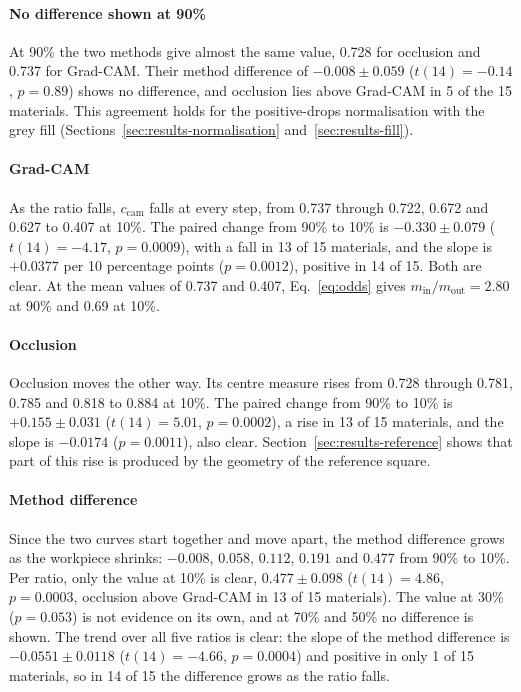 \paragraph{No difference shown at 90\%}
At 90\% the two methods give almost the same value, 0.728 for occlusion and 0.737 for
Grad-CAM. Their method difference of $-0.008 \pm 0.059$ ($t(14) = -0.14$, $p = 0.89$)
shows no difference, and occlusion lies above Grad-CAM in 5 of the 15 materials. This
agreement holds for the positive-drops normalisation with the grey fill
(Sections~\ref{sec:results-normalisation} and~\ref{sec:results-fill}).

\paragraph{Grad-CAM}
As the ratio falls, $c_{\mathrm{cam}}$ falls at every step, from 0.737 through 0.722,
0.672 and 0.627 to 0.407 at 10\%. The paired change from 90\% to 10\% is
$-0.330 \pm 0.079$ ($t(14) = -4.17$, $p = 0.0009$), with a fall in 13 of 15
materials, and the slope is $+0.0377$ per 10 percentage points ($p = 0.0012$),
positive in 14 of 15. Both are clear. At the mean values of 0.737 and 0.407,
Eq.~\eqref{eq:odds} gives $m_{\mathrm{in}}/m_{\mathrm{out}} = 2.80$ at 90\% and 0.69
at 10\%.

\paragraph{Occlusion}
Occlusion moves the other way. Its centre measure rises from 0.728 through 0.781,
0.785 and 0.818 to 0.884 at 10\%. The paired change from 90\% to 10\% is
$+0.155 \pm 0.031$ ($t(14) = 5.01$, $p = 0.0002$), a rise in 13 of 15 materials, and
the slope is $-0.0174$ ($p = 0.0011$), also clear. Section~\ref{sec:results-reference} shows that
part of this rise is produced by the geometry of the reference square.

\paragraph{Method difference}
Since the two curves start together and move apart, the method difference grows as the
workpiece shrinks: $-0.008$, $0.058$, $0.112$, $0.191$ and $0.477$ from 90\% to 10\%.
Per ratio, only the value at 10\% is clear, $0.477 \pm 0.098$ ($t(14) = 4.86$,
$p = 0.0003$, occlusion above Grad-CAM in 13 of 15 materials). The value at 30\%
($p = 0.053$) is not evidence on its own, and at 70\% and 50\% no difference is shown.
The trend over all five ratios is clear: the slope of the method difference is
$-0.0551 \pm 0.0118$ ($t(14) = -4.66$, $p = 0.0004$) and positive in only 1 of 15
materials, so in 14 of 15 the difference grows as the ratio falls.

